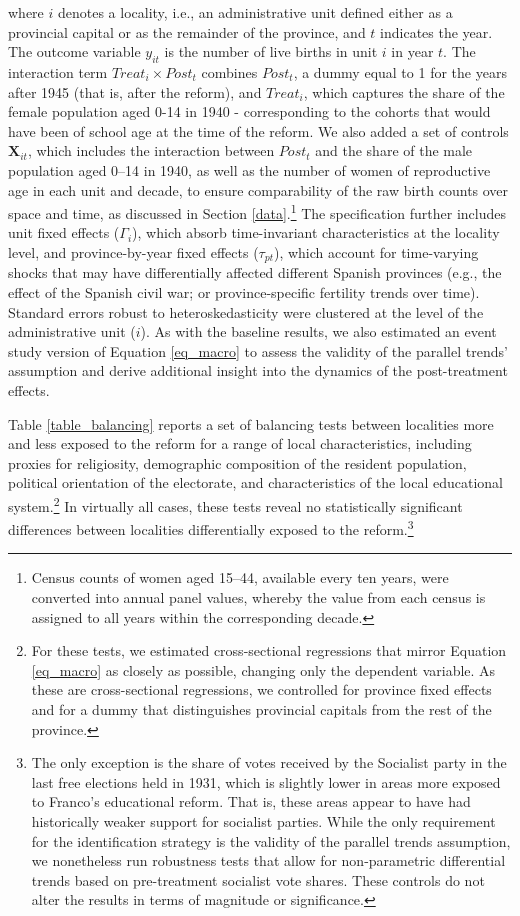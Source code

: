 \documentclass[a4paper,oneside,final,onecolumn,12pt,english]{article}
\begin{document}
where $i$ denotes a locality, i.e., an administrative unit defined either as a provincial capital or as the remainder of the province, and $t$ indicates the year. The outcome variable $y_{it}$ is the number of live births in unit $i$ in year $t$. The interaction term $\textit{Treat}_i \times \textit{Post}_t$ combines $Post_t$, a dummy equal to 1 for the years after 1945 (that is, after the reform), and $\textit{Treat}_i$, which captures the share of the female population aged 0-14 in 1940 - corresponding to the cohorts that would have been of school age at the time of the reform. We also added a set of controls $\mathbf{X}_{it}$, which includes the interaction between $Post_t$ and the share of the male population aged 0–14 in 1940, as well as the number of women of reproductive age in each unit and decade, to ensure comparability of the raw birth counts over space and time, as discussed in Section \ref{data}.\footnote{Census counts of women aged 15–44, available every ten years, were converted into annual panel values, whereby the value from each census is assigned to all years within the corresponding decade.} The specification further includes unit fixed effects ($\Gamma_i$), which absorb time-invariant characteristics at the locality level, and province-by-year fixed effects ($\tau_{pt}$), which account for time-varying shocks that may have differentially affected different Spanish provinces (e.g., the effect of the Spanish civil war; or province-specific fertility trends over time). Standard errors robust to heteroskedasticity were clustered at the level of the administrative unit ($i$). As with the baseline results, we also estimated an event study version of Equation \ref{eq_macro} to assess the validity of the parallel trends' assumption and derive additional insight into the dynamics of the post-treatment effects. 

Table \ref{table_balancing} reports a set of balancing tests between localities more and less exposed to the reform for a range of local characteristics, including proxies for religiosity, demographic composition of the resident population, political orientation of the electorate, and characteristics of the local educational system.\footnote{For these tests, we estimated cross-sectional regressions that mirror Equation \ref{eq_macro} as closely as possible, changing only the dependent variable. As these are cross-sectional regressions, we controlled for province fixed effects and for a dummy that distinguishes provincial capitals from the rest of the province.} In virtually all cases, these tests reveal no statistically significant differences between localities differentially exposed to the reform.\footnote{The only exception is the share of votes received by the Socialist party in the last free elections held in 1931, which is slightly lower in areas more exposed to Franco’s educational reform. That is, these areas appear to have had historically weaker support for socialist parties. While the only requirement for the identification strategy is the validity of the parallel trends assumption, we nonetheless run robustness tests that allow for non-parametric differential trends based on pre-treatment socialist vote shares. These controls do not alter the results in terms of magnitude or significance.}
\end{document}
